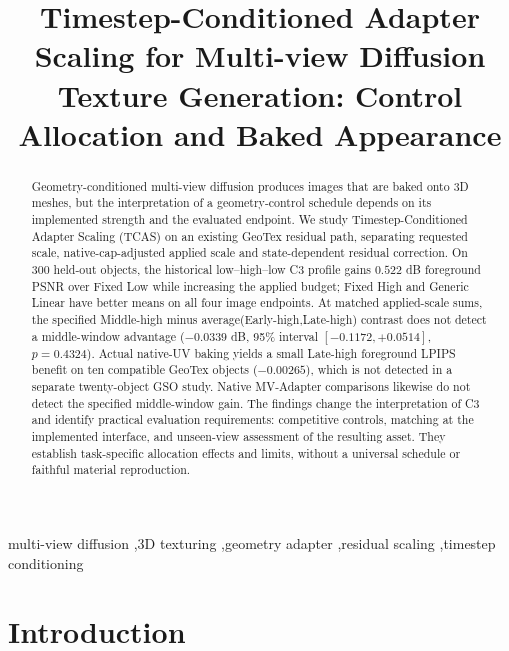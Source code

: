 \documentclass[times,twocolumn,final]{elsarticle}
\begin{document}
\begin{frontmatter}

\title{Timestep-Conditioned Adapter Scaling for Multi-view Diffusion Texture Generation: Control Allocation and Baked Appearance}


\begin{abstract}
Geometry-conditioned multi-view diffusion produces images that are baked onto 3D meshes, but the interpretation of a geometry-control schedule depends on its implemented strength and the evaluated endpoint. We study Timestep-Conditioned Adapter Scaling (TCAS) on an existing GeoTex residual path, separating requested scale, native-cap-adjusted applied scale and state-dependent residual correction. On 300 held-out objects, the historical low--high--low C3 profile gains $0.522$ dB foreground PSNR over Fixed Low while increasing the applied budget; Fixed High and Generic Linear have better means on all four image endpoints. At matched applied-scale sums, the specified Middle-high minus average(Early-high,Late-high) contrast does not detect a middle-window advantage ($-0.0339$ dB, 95\% interval $[-0.1172,+0.0514]$, $p=0.4324$). Actual native-UV baking yields a small Late-high foreground LPIPS benefit on ten compatible GeoTex objects ($-0.00265$), which is not detected in a separate twenty-object GSO study. Native MV-Adapter comparisons likewise do not detect the specified middle-window gain. The findings change the interpretation of C3 and identify practical evaluation requirements: competitive controls, matching at the implemented interface, and unseen-view assessment of the resulting asset. They establish task-specific allocation effects and limits, without a universal schedule or faithful material reproduction.

\end{abstract}

\begin{keyword}
\KWD
multi-view diffusion \sep 3D texturing \sep geometry adapter \sep residual scaling \sep timestep conditioning
\end{keyword}

\end{frontmatter}

\raggedbottom
\linenumbers

\section{Introduction}
\label{sec:intro}
\end{document}
